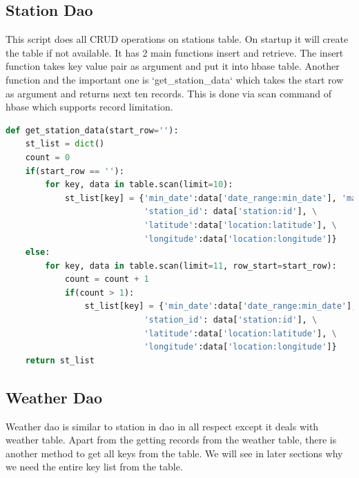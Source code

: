 \documentclass[9pt,twocolumn,twoside]{../../styles/osajnl}
\begin{document}
\subsection{Station Dao}
This script does all CRUD operations on stations table. On startup it will create the table if not available. It has 2 main functions insert and retrieve. The insert function takes key value pair as argument and put it into hbase table. Another function and the important one is `get\_station\_data` which takes the start row as argument and returns next ten records. This is done via scan command of hbase which supports record limitation.
\begin{lstlisting}[language=Python,caption=Stations Dao,breaklines=true]
def get_station_data(start_row=''):   
    st_list = dict()
    count = 0    
    if(start_row == ''):    
        for key, data in table.scan(limit=10):
            st_list[key] = {'min_date':data['date_range:min_date'], 'max_date':data['date_range:max_date'] , \
                            'station_id': data['station:id'], \
                            'latitude':data['location:latitude'], \
                            'longitude':data['location:longitude']}            
    else:
        for key, data in table.scan(limit=11, row_start=start_row):            
            count = count + 1
            if(count > 1):
                st_list[key] = {'min_date':data['date_range:min_date'], 'max_date':data['date_range:max_date'], \
                            'station_id': data['station:id'], \
                            'latitude':data['location:latitude'], \
                            'longitude':data['location:longitude']}    
    return st_list
\end{lstlisting}
\subsection{Weather Dao}
Weather dao is similar to station in dao in all respect except it deals with weather table. Apart from the getting records from the weather table, there is another method to get all keys from the table. We will see in later sections why we need the entire key list from the table.
\end{document}
